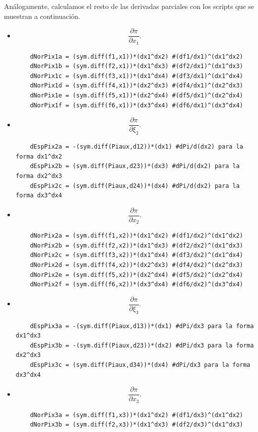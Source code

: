 \documentclass[a4paper,10pt]{book}
\begin{document}
An\'alogamente, calculamos el resto de las derivadas parciales con los scripts que se muestran a continuaci\'on.
\begin{itemize}
    \item $$\frac{\partial \pi}{\partial x_{1}}.$$
\lstset{stepnumber=0}
\begin{lstlisting}
    dNorPix1a = (sym.diff(f1,x1))*(dx1^dx2) #(df1/dx1)^(dx1^dx2)  
    dNorPix1b = (sym.diff(f2,x1))*(dx1^dx3) #(df2/dx1)^(dx1^dx3)
    dNorPix1c = (sym.diff(f3,x1))*(dx1^dx4) #(df3/dx1)^(dx1^dx4)
    dNorPix1d = (sym.diff(f4,x1))*(dx2^dx3) #(df4/dx1)^(dx2^dx3)
    dNorPix1e = (sym.diff(f5,x1))*(dx2^dx4) #(df5/dx1)^(dx2^dx4)
    dNorPix1f = (sym.diff(f6,x1))*(dx3^dx4) #(df6/dx1)^(dx3^dx4)
\end{lstlisting}
\item $$\frac{\partial \pi}{\partial \xi_{2}}.$$
\lstset{stepnumber=0}
\begin{lstlisting}
    dEspPix2a = -(sym.diff(Piaux,d12))*(dx1) #dPi/d(dx2) para la forma dx1^dx2 
    dEspPix2b = (sym.diff(Piaux,d23))*(dx3) #dPi/d(dx2) para la forma dx2^dx3
    dEspPix2c = (sym.diff(Piaux,d24))*(dx4) #dPi/d(dx2) para la forma dx3^dx4
\end{lstlisting}
\item $$\frac{\partial \pi}{\partial x_{2}}.$$
\lstset{stepnumber=0}
\begin{lstlisting}
    dNorPix2a = (sym.diff(f1,x2))*(dx1^dx2) #(df1/dx2)^(dx1^dx2)
    dNorPix2b = (sym.diff(f2,x2))*(dx1^dx3) #(df2/dx2)^(dx1^dx3)
    dNorPix2c = (sym.diff(f3,x2))*(dx1^dx4) #(df3/dx2)^(dx1^dx4)
    dNorPix2d = (sym.diff(f4,x2))*(dx2^dx3) #(df4/dx2)^(dx2^dx3)
    dNorPix2e = (sym.diff(f5,x2))*(dx2^dx4) #(df5/dx2)^(dx2^dx4)
    dNorPix2f = (sym.diff(f6,x2))*(dx3^dx4) #(df6/dx2)^(dx3^dx4)
\end{lstlisting}
\item $$\frac{\partial \pi}{\partial \xi_{3}}.$$
\lstset{stepnumber=0}
\begin{lstlisting}
    dEspPix3a = -(sym.diff(Piaux,d13))*(dx1) #dPi/dx3 para la forma dx1^dx3
    dEspPix3b = -(sym.diff(Piaux,d23))*(dx2) #dPi/dx3 para la forma dx2^dx3
    dEspPix3c = (sym.diff(Piaux,d34))*(dx4) #dPi/dx3 para la forma dx3^dx4
\end{lstlisting}
\item $$\frac{\partial \pi}{\partial x_{3}}.$$
\lstset{stepnumber=0}
\begin{lstlisting}
    dNorPix3a = (sym.diff(f1,x3))*(dx1^dx2) #(df1/dx3)^(dx1^dx2)
    dNorPix3b = (sym.diff(f2,x3))*(dx1^dx3) #(df2/dx3)^(dx1^dx3)

\end{lstlisting}
\end{itemize}
\end{document}
